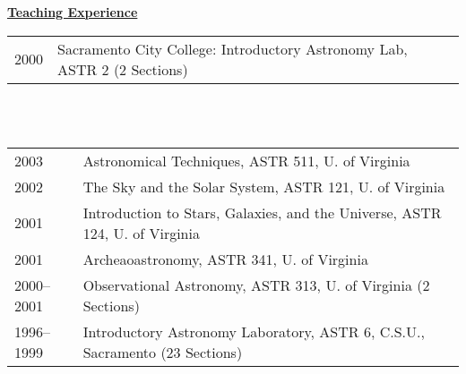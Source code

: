 \documentclass[12pt]{article}
\begin{document}
\noindent \underline{\bf Teaching Experience}
\vskip 0.04in
 \\
\vskip -0.20in
\noindent \begin{tabular}{ll}
2000\phantom{--2001}   &  Sacramento City College: Introductory Astronomy Lab, ASTR 2 (2 Sections) \\
\end{tabular}\\
\vskip -0.15in
\\ %
\vskip -0.15in
\noindent \begin{tabular}{ll}
2003 &  Astronomical Techniques, ASTR 511, U. of Virginia\\
2002 &  The Sky and the Solar System, ASTR 121, U. of Virginia \\
2001 &  Introduction to Stars, Galaxies, and the Universe, ASTR 124, U. of Virginia \\
2001 &  Archeaoastronomy, ASTR 341, U. of Virginia \\
2000--2001 & Observational Astronomy, ASTR 313, U. of Virginia (2 Sections)\\
1996--1999 & Introductory Astronomy Laboratory, ASTR 6, C.S.U., Sacramento (23 Sections) \\ %
\end{tabular}\\

\end{document}
